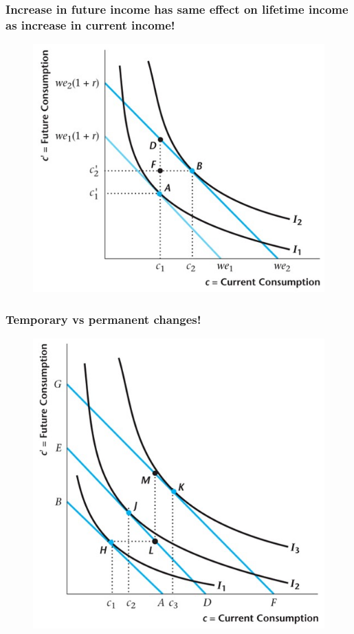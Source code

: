 \documentclass{beamer}
\begin{document}
\begin{frame}
\frametitle[alignment=center]{Increase in future income has same effect on lifetime income as increase in current income!}
\begin{figure}
\centering
\includegraphics[scale=0.5]{Figures/W_Fig_9pt8.png}
\end{figure}
\end{frame}

\begin{frame}
\frametitle[alignment=center]{Temporary vs permanent changes!}
\begin{figure}
\centering
\includegraphics[scale=0.5]{Figures/W_Fig_9pt9.png}
\end{figure}
\end{frame}
\end{document}
